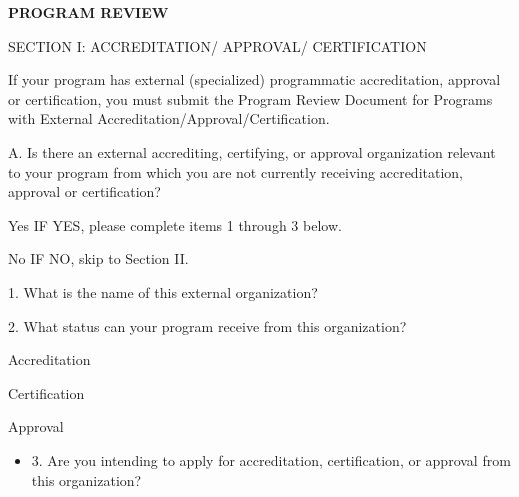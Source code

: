 

\textbf{PROGRAM REVIEW}

SECTION I: ACCREDITATION/ APPROVAL/ CERTIFICATION

If your program has external (specialized) programmatic accreditation, approval or certification, you must submit the Program Review Document for Programs with External Accreditation/Approval/Certification.

A. Is there an external accrediting, certifying, or approval organization relevant to your program from which you are not currently receiving accreditation, approval or certification?
\begin{itemize}

  \begin{todolist}
  \item Yes IF YES, please complete items 1 through 3 below.
  \item [\done]No IF NO, skip to Section II.
  \end{todolist}
\end{itemize}






1. What is the name of this external organization?

2. What status can your program receive from this organization?
\begin{itemize}

  \begin{todolist}
  \item Accreditation 
  \item Certification 
  \item Approval
  \end{todolist}
\end{itemize}





\begin{itemize}
  \item 3. Are you intending to apply for accreditation, certification, or approval from this organization?
\end{itemize}





